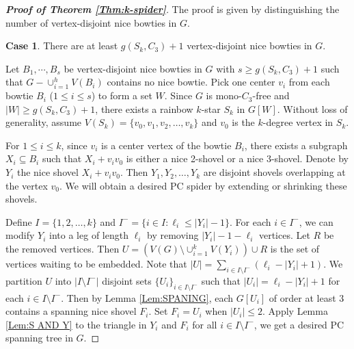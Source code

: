 \documentclass[10pt,a4paper]{article}
\theoremstyle{definition}
\newtheorem{case}{Case}
\begin{document}
\setcounter{case}{0}
\begin{proof}[\textbf{Proof of Theorem \ref{Thm:k-spider}}]
The proof is given by distinguishing the number of vertex-disjoint nice bowties in $G$.
\begin{case}
    There are at least $g(S_k,C_3)+1$ vertex-disjoint nice bowties in $G$.
\end{case}
Let $B_1,\cdots,B_s$ be vertex-disjoint nice bowties in $G$ with $s\geq g(S_k,C_3)+1$ such that $G-\cup^h_{i=1} {V(B_i)}$  contains no nice bowtie.   Pick one center $v_i$ from each bowtie $B_i$ ($1\leq i\leq s$) to form a set  $W$.  Since $G$ is mono-$C_3$-free and $|W|\geq g(S_k,C_3)+1$, there exists a rainbow $k$-star $S_k$ in $G[W]$. Without loss of generality, assume $V(S_k)=\{v_0, v_1,v_2, \ldots, v_k\}$ and $v_0$ is the $k$-degree vertex in $S_k$.

For $1\leq i\leq k$, since $v_i$ is a center vertex of the bowtie $B_i$, there exists a subgraph $X_i\subseteq B_i$ such that $X_i+v_iv_0$ is either a nice 2-shovel or a nice 3-shovel. Denote by $Y_i$  the nice shovel $X_i+v_iv_0$. Then $Y_1,Y_2,\ldots,Y_k$ are disjoint shovels overlapping at the vertex $v_0$. We will obtain a desired PC spider by extending or shrinking these shovels.

Define $I=\{1,2,\ldots,k\}$ and $I^-=\{i\in I:  \ell_i \leq |Y_i|-1\}$.
For each $i\in I^-$,  we can modify $Y_i$ into a leg of length $\ell_i$ by removing  $|Y_i|-1-\ell_i $ vertices.  Let $R$  be the removed vertices. Then $U=(V(G)\setminus \cup^k_{i=1} V(Y_i))\cup R$ is the set of vertices waiting to be embedded. Note that $|U|=\sum_{i\in I\setminus I^-} {(\ell_i-|Y_i|+1)}$. We partition $U$ into $|I\setminus I^-|$ disjoint sets $\{U_i\}_{i\in I\setminus I^-}$  such that $|U_i|=\ell_i-|Y_i|+1$ for each $i\in I\setminus I^-$.
Then by Lemma \ref{Lem:SPANING}, each $G[U_i]$ of order at least $3$ contains a spanning nice shovel $F_i$. Set $F_i=U_i$ when $|U_i|\leq 2$. Apply Lemma \ref{Lem:S AND Y} to the triangle in $Y_i$ and $F_i$ for all $i\in I\setminus I^-$, we get a desired PC spanning tree in $G$.


\end{proof}
\end{document}
